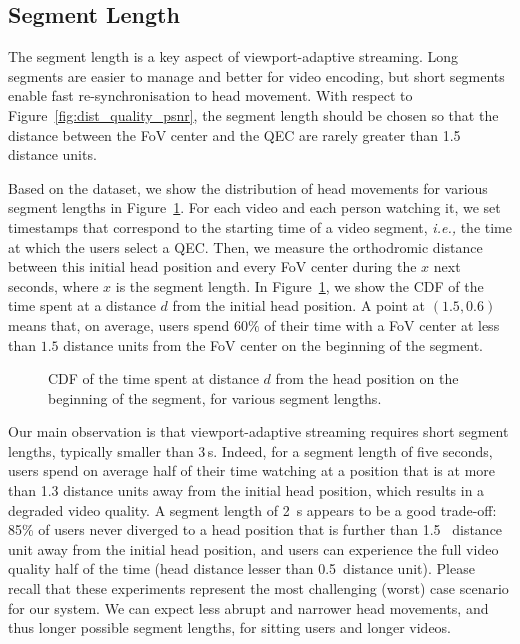 \subsection{Segment Length}

The segment length is a key
aspect of viewport-adaptive streaming. Long segments are easier to manage and better for video encoding,
but short segments enable fast re-synchronisation to head movement. With respect to
Figure~\ref{fig:dist_quality_psnr}, the
segment length should be chosen so that the
distance between the FoV center and the QEC are rarely greater than 1.5 distance units.

Based on the dataset, we show the distribution of head movements for various segment lengths
in Figure~\ref{cdf-dataset}. For each video and each person watching
it, we set timestamps that correspond to the starting time of a video
segment, \textit{i.e.,} the time at which the users select a QEC. Then, we measure the orthodromic distance
between this initial head position and every FoV center during the $x$
next seconds, where $x$ is the segment length. In
Figure~\ref{cdf-dataset}, we show the \ac{CDF} of the time spent at a
distance $d$ from the initial head position. A point at $(1.5,0.6)$
means that, on average, users spend $60\%$ of their time with a FoV
center at less than $1.5$ distance units from the FoV center on the
beginning of the segment.

\begin{figure}[htbp]
\centering

\caption{CDF of the time spent at distance $d$ from the head position on the beginning of the
segment, for various segment lengths.}\label{cdf-dataset}
\end{figure}

Our main observation is that viewport-adaptive streaming requires
short segment lengths, typically smaller than 3\,s. Indeed, for a
segment length of five seconds, users spend on average half of their
time watching at a position that is at more than 1.3 distance units
away from the initial head position, which results in a degraded video
quality. A segment length of \SI{2}{\second} appears to be a good trade-off:
85\% of
users never diverged to a head position that is further than 1.5~
distance unit away from the initial head position, and users can experience the full
video quality half of the time (head distance lesser than 0.5~distance unit). Please recall that
these experiments represent the most challenging (worst) case scenario
for our system. We can expect less abrupt and narrower head movements,
and thus longer possible segment lengths, for sitting users and longer
videos.

